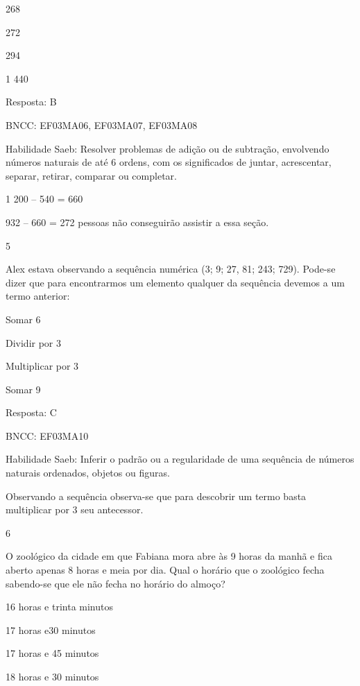 \begin{escolha}
\begin{escolha}
\item
  268
\item
  272
\item
  294
\item
  1 440
\end{escolha}

Resposta: B

BNCC: EF03MA06, EF03MA07, EF03MA08

Habilidade Saeb: Resolver problemas de adição ou de subtração,
envolvendo números naturais de até 6 ordens, com os significados de
juntar, acrescentar, separar, retirar, comparar ou completar.

1 200 -- 540 = 660

932 -- 660 = 272 pessoas não conseguirão assistir a essa seção.

\num{5}

Alex estava observando a sequência numérica (3; 9; 27, 81; 243; 729).
Pode-se dizer que para encontrarmos um elemento qualquer da sequência
devemos a um termo anterior:

\begin{escolha}
\item
  Somar 6
\item
  Dividir por 3
\item
  Multiplicar por 3
\item
  Somar 9
\end{escolha}

Resposta: C

BNCC: EF03MA10

Habilidade Saeb: Inferir o padrão ou a regularidade de uma sequência de
números naturais ordenados, objetos ou figuras.

Observando a sequência observa-se que para descobrir um termo basta
multiplicar por 3 seu antecessor.

\num{6}

O zoológico da cidade em que Fabiana mora abre às 9 horas da manhã e
fica aberto apenas 8 horas e meia por dia. Qual o horário que o
zoológico fecha sabendo-se que ele não fecha no horário do almoço?

\begin{escolha}
\item
  16 horas e trinta minutos
\item
  17 horas e30 minutos
\item
  17 horas e 45 minutos
\item
  18 horas e 30 minutos
\end{escolha}


\end{escolha}
